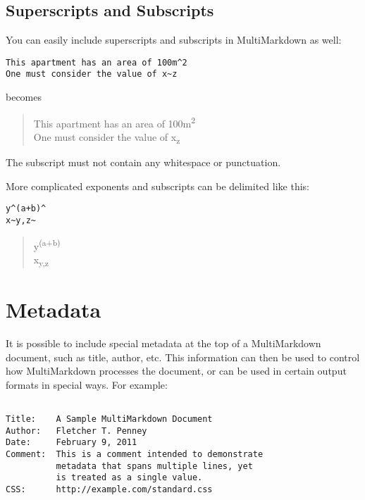 \subsection{Superscripts and Subscripts}
\label{superscriptsandsubscripts}

You can easily include superscripts and subscripts in MultiMarkdown as well:

\begin{verbatim}
This apartment has an area of 100m^2
One must consider the value of x~z
\end{verbatim}

becomes

\begin{quote}
This apartment has an area of 100m\textsuperscript{2}\\
One must consider the value of x\textsubscript{z}
\end{quote}

The subscript must not contain any whitespace or punctuation.

More complicated exponents and subscripts can be delimited like this:

\begin{verbatim}
y^(a+b)^
x~y,z~
\end{verbatim}

\begin{quote}
y\textsuperscript{(a+b)}\\
x\textsubscript{y,z}
\end{quote}

\section{Metadata}
\label{metadata}

It is possible to include special metadata at the top of a MultiMarkdown
document, such as title, author, etc. This information can then be used to
control how MultiMarkdown processes the document, or can be used in certain
output formats in special ways. For example:

\begin{verbatim}

Title:    A Sample MultiMarkdown Document  
Author:   Fletcher T. Penney  
Date:     February 9, 2011  
Comment:  This is a comment intended to demonstrate  
          metadata that spans multiple lines, yet  
          is treated as a single value.  
CSS:      http://example.com/standard.css
\end{verbatim}


